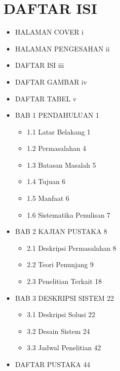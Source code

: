 \documentclass[12pt,oneside]{report}
\begin{document}

\chapter*{DAFTAR ISI}

\begin{itemize}
\item HALAMAN COVER \hfill i
\item HALAMAN PENGESAHAN \hfill ii
\item DAFTAR ISI \hfill iii
\item DAFTAR GAMBAR \hfill iv
\item DAFTAR TABEL \hfill v
\item BAB 1 PENDAHULUAN \hfill 1
  \begin{itemize}
  \item 1.1 Latar Belakang \hfill 1
  \item 1.2 Permasalahan \hfill 4
  \item 1.3 Batasan Masalah \hfill 5
  \item 1.4 Tujuan \hfill 6
  \item 1.5 Manfaat \hfill 6
  \item 1.6 Sistematika Penulisan \hfill 7
  \end{itemize}
\item BAB 2 KAJIAN PUSTAKA \hfill 8
  \begin{itemize}
  \item 2.1 Deskripsi Permasalahan \hfill 8
  \item 2.2 Teori Penunjang \hfill 9
  \item 2.3 Penelitian Terkait \hfill 18
  \end{itemize}
\item BAB 3 DESKRIPSI SISTEM \hfill 22
  \begin{itemize}
  \item 3.1 Deskripsi Solusi \hfill 22
  \item 3.2 Desain Sistem \hfill 24
  \item 3.3 Jadwal Penelitian \hfill 42
  \end{itemize}
\item DAFTAR PUSTAKA \hfill 44
\end{itemize}

\newpage

\end{document}
